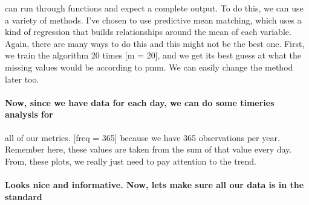 \documentclass[
]{article}
\newenvironment{Shaded}{\begin{snugshade}}{\end{snugshade}}
\newcommand{\CommentTok}[1]{\textcolor[rgb]{0.56,0.35,0.01}{\textit{#1}}}
\begin{document}
can run through functions and expect a complete output. To do this, we
can use a variety of methods. I've chosen to use predictive mean
matching, which uses a kind of regression that builds relationships
around the mean of each variable. Again, there are many ways to do this
and this might not be the best one. First, we train the algorithm 20
times {[}m = 20{]}, and we get its best guess at what the missing values
would be according to pmm. We can easily change the method later too.

\hypertarget{now-since-we-have-data-for-each-day-we-can-do-some-timeries-analysis-for}{%
\paragraph{Now, since we have data for each day, we can do some timeries
analysis
for}\label{now-since-we-have-data-for-each-day-we-can-do-some-timeries-analysis-for}}

all of our metrics. {[}freq = 365{]} because we have 365 observations
per year. Remember here, these values are taken from the sum of that
value every day. From, these plots, we really just need to pay attention
to the trend.

\begin{Shaded}
\end{Shaded}

\hypertarget{looks-nice-and-informative.-now-lets-make-sure-all-our-data-is-in-the-standard}{%
\paragraph{Looks nice and informative. Now, lets make sure all our data
is in the
standard}\label{looks-nice-and-informative.-now-lets-make-sure-all-our-data-is-in-the-standard}}
\end{document}
